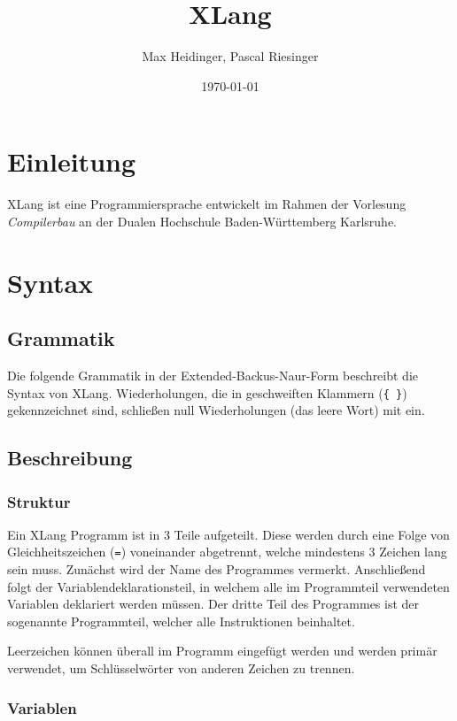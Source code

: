 \documentclass[a4paper]{article}
\title{XLang}
\author{Max Heidinger, Pascal Riesinger}
\date{\today}
\begin{document}
\maketitle


\section{Einleitung}

XLang ist eine Programmiersprache entwickelt im Rahmen der Vorlesung \textit{Compilerbau} an der
Dualen Hochschule Baden-Württemberg Karlsruhe.

\section{Syntax}

\subsection{Grammatik}

Die folgende Grammatik in der Extended-Backus-Naur-Form beschreibt die Syntax von XLang.
Wiederholungen, die in geschweiften Klammern (\texttt{\{ \}}) gekennzeichnet sind, schließen null Wiederholungen (das leere Wort) mit ein.




\subsection{Beschreibung}

\subsubsection{Struktur}

Ein XLang Programm ist in 3 Teile aufgeteilt.
Diese werden durch eine Folge von Gleichheitszeichen (\texttt{=}) voneinander abgetrennt, welche
mindestens 3 Zeichen lang sein muss.
Zunächst wird der Name des Programmes vermerkt.
Anschließend folgt der Variablendeklarationsteil, in welchem alle im Programmteil verwendeten
Variablen deklariert werden müssen.
Der dritte Teil des Programmes ist der sogenannte Programmteil, welcher alle Instruktionen
beinhaltet.

Leerzeichen können überall im Programm eingefügt werden und werden primär verwendet, um
Schlüsselwörter von anderen Zeichen zu trennen.

\subsubsection{Variablen}
\end{document}
